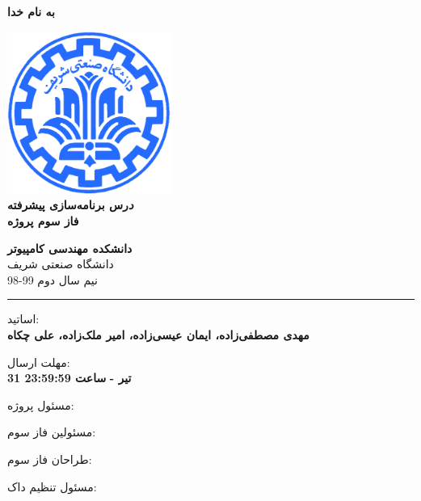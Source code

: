 \documentclass[]{article}
\begin{document}
\begin{titlepage}
\begin{center}

\textbf{ \Huge{به نام خدا} }
        
\vspace{0.2cm}

\includegraphics[width=0.4\textwidth]{sharif1.png}\\
\vspace{0.2cm}
\textbf{ \Huge{\emph درس برنامه‌سازی پیشرفته} }\\
\vspace{0.25cm}
\textbf{ \Large{ فاز سوم پروژه} }
\vspace{0.2cm}
       
 
      \large \textbf{دانشکده مهندسی کامپیوتر}\\\vspace{0.1cm}
    \large   دانشگاه صنعتی شریف\\\vspace{0.2cm}
       \large   ﻧﯿﻢ سال دوم 99-98 \\\vspace{0.10cm}
      \noindent\rule[1ex]{\linewidth}{1pt}
اساتید:\\
    \textbf{{مهدی مصطفی‌زاده، ایمان عیسی‌زاده، امیر ملک‌زاده، علی چکاه}}



    \vspace{0.20cm}

   مهلت ارسال:\\
    \textbf{{31 تیر - }}
    \textbf{{ساعت 23:59:59}}

    \vspace{0.10cm}
مسئول پروژه:\\
    \textbf{}
    
        \vspace{0.10cm}
مسئولین فاز سوم:\\
    \textbf{}
    
        \vspace{0.10cm}
طراحان فاز سوم:\\
    \textbf{}
    
        \vspace{0.05cm}
مسئول تنظیم داک:\\
    \textbf{}
    

\end{center}
\end{titlepage}
\end{document}
